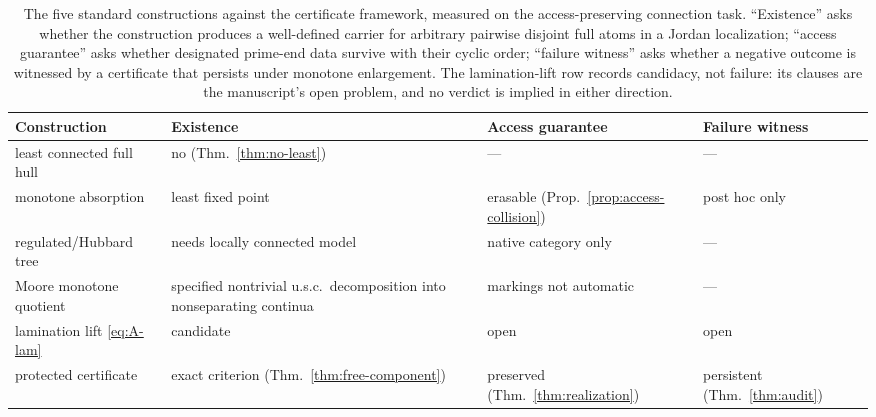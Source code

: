 \begin{table}[H]
\centering
\small
\begin{tabularx}{\textwidth}{@{}P{0.25\textwidth}P{0.22\textwidth}P{0.22\textwidth}Y@{}}
\toprule
Construction & Existence & Access guarantee & Failure witness\\
\midrule
least connected full hull & no (Thm.~\ref{thm:no-least}) & --- & ---\\
monotone absorption & least fixed point \cite{MWman} &
  erasable (Prop.~\ref{prop:access-collision}) & post hoc only\\
regulated/Hubbard tree & needs locally connected model \cite{DH85,KKL26} &
  native category only & ---\\
Moore monotone quotient & specified nontrivial u.s.c.\ decomposition
  into nonseparating continua \cite{Moo25} &
  markings not automatic & ---\\
lamination lift \eqref{eq:A-lam} & candidate \cite{MWman} & open & open\\
protected certificate & exact criterion (Thm.~\ref{thm:free-component}) &
  preserved (Thm.~\ref{thm:realization}) &
  persistent (Thm.~\ref{thm:audit})\\
\bottomrule
\end{tabularx}
\caption{The five standard constructions against the certificate
framework, measured on the access-preserving connection task.  ``Existence''
asks whether the construction produces a well-defined carrier
for arbitrary pairwise disjoint full atoms in a Jordan localization;
``access guarantee'' asks whether designated prime-end data survive
with their cyclic order; ``failure witness'' asks whether a negative
outcome is witnessed by a certificate that persists under monotone
enlargement.  The lamination-lift row records candidacy, not failure:
its clauses are the manuscript's open problem, and no verdict is implied
in either direction.}
\label{tab:A-comparison}
\end{table}
